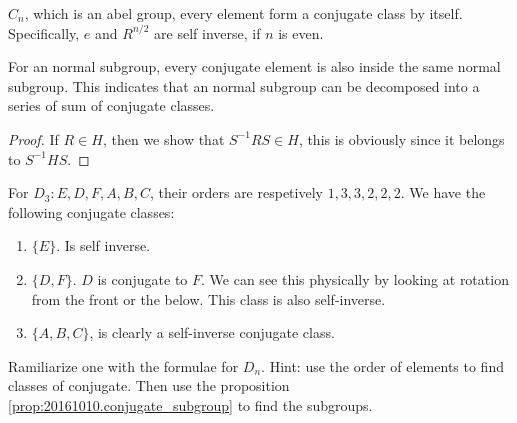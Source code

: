 \begin{fact}
    $C_n$, which is an abel group, every element form a conjugate
    class by itself. Specifically, $e$ and $R^{n/2}$ are self inverse,
    if $n$ is even.
\end{fact}

\begin{prop}
    \label{prop:20161010.conjugate_subgroup}
    For an normal subgroup, every conjugate element is also
    inside the same normal subgroup. This indicates that an normal
    subgroup can be decomposed into a series of sum of conjugate classes.
\end{prop}
\begin{proof}
    If $R\in H$, then we show that $S^{-1}RS\in H$, this is obviously
    since it belongs to $S^{-1}HS$.
\end{proof}

\begin{ex}
    For $D_3: E,D,F,A,B,C$, their orders are respetively
    $1,3,3,2,2,2$. We have the following conjugate classes:
    \begin{enumerate}
        \item $\{ E\}$. Is self inverse.
        \item $\{ D,F\}$. $D$ is conjugate to $F$. We can see
            this physically by looking at rotation from the front
            or the below. This class is also self-inverse.
        \item $\{A,B,C\}$, is clearly a self-inverse conjugate
            class.
    \end{enumerate}
\end{ex}
\begin{ex}[$D_6$]
    Ramiliarize one with the formulae for $D_n$. Hint: use the order of
    elements to find classes of conjugate. Then use the proposition
    \ref{prop:20161010.conjugate_subgroup} to find the subgroups.
\end{ex}






